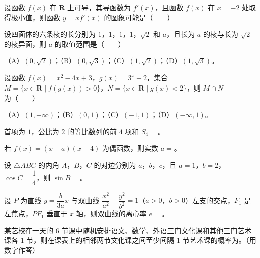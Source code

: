 \begin{question}
设函数 $f(x)$ 在 $\mathbf R$ 上可导，其导函数为 $f'(x)$，且函数 $f(x)$ 在 $x=-2$ 处取得极小值，则函数 $y=xf'(x)$ 的图象可能是\mbox{（　　）}
\nopagebreak[4]
\begin{center}\end{center}
\nopagebreak[4]
\end{question}
\begin{question}
设四面体的六条棱的长分别为 $1$，$1$，$1$，$1$，$\sqrt2$ 和 $a$，且长为 $a$ 的棱与长为 $\sqrt2$ 的棱异面，则 $a$ 的取值范围是\mbox{（　　）}

（A）$\left(0,\sqrt2\right)$；（B）$\left(0,\sqrt3\right)$；（C）$\left(1,\sqrt2\right)$；（D）$\left(1,\sqrt3\right)$。

\end{question}
\begin{question}
设函数 $f(x)=x^2-4x+3$，$g(x)=3^x-2$，集合 $M=\{x\in\mathbf R\mid f(g(x))>0\}$，$N=\{x\in\mathbf R\mid g(x)<2\}$，则 $M\cap N$ 为\mbox{（　　）}

（A）$(1,+\infty)$；（B）$(0,1)$；（C）$(-1,1)$；（D）$(-\infty,1)$。

\end{question}

\begin{question}
首项为 $1$，公比为 $2$ 的等比数列的前 $4$ 项和 $S_4=$\gkblank{}。

\end{question}
\begin{question}
若 $f(x)=(x+a)(x-4)$ 为偶函数，则实数 $a=$\gkblank{}。

\end{question}
\begin{question}
设 $\triangle ABC$ 的内角 $A$，$B$，$C$ 的对边分别为 $a$，$b$，$c$，且 $a=1$，$b=2$，$\cos C=\dfrac14$，则 $\sin B=$\gkblank{}。

\end{question}
\begin{question}
设 $P$ 为直线 $y=\dfrac b{3a}x$ 与双曲线 $\dfrac{x^2}{a^2}-\dfrac{y^2}{b^2}=1$（$a>0$，$b>0$）左支的交点，$F_1$ 是左焦点，$PF_1$ 垂直于 $x$ 轴，则双曲线的离心率 $e=$\gkblank{}。

\end{question}
\begin{question}
某艺校在一天的 $6$ 节课中随机安排语文、数学、外语三门文化课和其他三门艺术课各 $1$ 节，则在课表上的相邻两节文化课之间至少间隔 $1$ 节艺术课的概率为\gkblank{}。（用数字作答）

\end{question}

